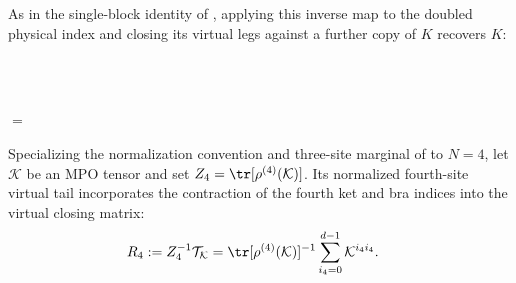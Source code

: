 As in the single-block identity of
\cite[Appendix~C.2, lines~1671--1676]{Cirac2016MPDO_arXiv}, applying this
inverse map to the doubled physical index and closing its virtual legs against
a further copy of $K$ recovers $K$:
\begin{tenkzequation}
    \tenkzkernel
    \begin{tenkz}[rows={ket,ket,bra}, cols=1, west=cup, east=cup, bonds=none]
         \\
         \\
    \end{tenkz}
    $ = $
    \begin{tenkz}[cols=1, west=open, east=open]
    \end{tenkz}
\end{tenkzequation}

\begin{definition}
    \label{def:mpdo_normalized_four_site_tail}
    \leanok
    Specializing the normalization convention and three-site marginal of
    \cite[lines~792--793 and 1343--1348]{Cirac2016MPDO_arXiv} to $N=4$, let
    $\mathcal K$ be an MPO tensor and set
    $Z_4=\tr[\rho^{(4)}(\mathcal K)]$. Its normalized fourth-site virtual tail
    incorporates the contraction of the fourth ket and bra indices into the
    virtual closing matrix:
    \begin{align}
        R_4
         & :=Z_4^{-1}\mathcal T_{\mathcal K}
        =\tr[\rho^{(4)}(\mathcal K)]^{-1}
        \sum_{i_4=0}^{d-1}\mathcal K^{i_4i_4}.
        \label{eq:rfp_normalized_tail}
    \end{align}
\end{definition}

